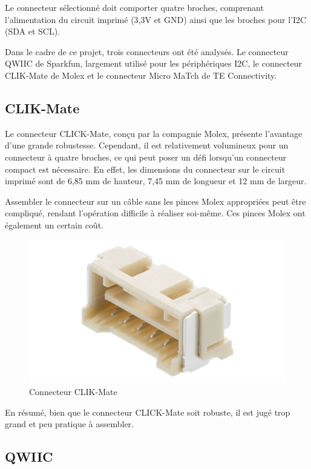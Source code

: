 Le connecteur sélectionné doit comporter quatre broches, comprenant l'alimentation du circuit imprimé (3,3V et GND) ainsi que les broches pour l'I2C (SDA et SCL).

Dans le cadre de ce projet, trois connecteurs ont été analysés.
Le connecteur QWIIC de Sparkfun, largement utilisé pour les périphériques I2C, le connecteur CLIK-Mate de Molex et le connecteur Micro MaTch de TE Connectivity.

\subsection{CLIK-Mate}

Le connecteur CLICK-Mate, conçu par la compagnie Molex, présente l'avantage d'une grande robustesse.
Cependant, il est relativement volumineux pour un connecteur à quatre broches, ce qui peut poser un défi lorsqu'un connecteur compact est nécessaire.
En effet, les dimensions du connecteur sur le circuit imprimé sont de 6,85 mm de hauteur, 7,45 mm de longueur et 12 mm de largeur.

Assembler le connecteur sur un câble sans les pinces Molex appropriées peut être compliqué, rendant l'opération difficile à réaliser soi-même. Ces pinces Molex ont également un certain coût.

\begin{figure}[H]
    \centering
    \includegraphics[scale=0.085]{./assets/figures/clik_mate.jpg}
    \caption{\cite{clikmate} Connecteur CLIK-Mate}
\end{figure}

En résumé, bien que le connecteur CLICK-Mate soit robuste, il est jugé trop grand et peu pratique à assembler.

\subsection{QWIIC}

